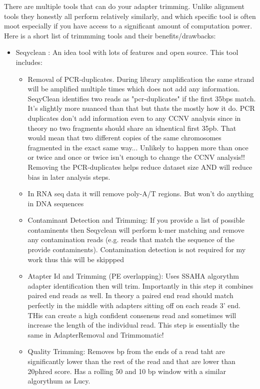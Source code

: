 \documentclass{article}
\begin{document}
    There are multiple tools that can do your adapter trimming.  Unlike alignment tools they honestly all perform relatively similarly, and which specific tool is often moot especially if you have access to a significant amount of computation power.  Here is a short list of trimmming tools and their benefits/drawbacks:
    \begin{itemize}
        \item Seqyclean \cite{zhbannikovSeqyCleanPipelineHighthroughput2017b}:  An idea tool with lots of features and open source.  This tool includes:
            \begin{itemize}
                \item Removal of PCR-duplicates.  During library amplification the same strand will be amplified multiple times which does not add any information.  SeqyClean identifies two reads as "pcr-duplicates" if the first 35bps match.  It's slightly more nuanced than that but thats the mostly how it do.  PCR duplicates don't add information even to any CCNV analysis since in theory no two fragments should share an idnentical first 35pb.   That would mean that two different copies of the same chromosomes fragmented in the exact same way... Unlikely to happen more than once or twice and once or twice isn't enough to change the CCNV analysis!!  Removing the PCR-duplicates helps reduce dataset size AND will reduce bias in later analysis steps.
                \item In RNA seq data it will remove poly-A/T regions.   But won't do anything in DNA sequences
                \item Contaminant Detection and Trimming:   If you provide a list of possible contaminents then Seqyclean will perform k-mer matching and remove any contamination reads (e.g. reads that match the sequence of the provide contaminents).   Contamination detection is not required for my work thus this will be skippped
                \item Atapter Id and Trimming (PE overlapping):  Uses SSAHA \cite{ningSSAHAFastSearch2001} algorythm adapter identification then will trim.  Importantly in this step it combines paired end reads as well.   In theory a paired end read should match perfectly in the middle with adapters sitting off on each reads 3' end.     THis can create a high confident consensus read and sometimes will increase the length of the individual read.  This step is essentially the same in AdapterRemoval and Trimmomatic!
                \item Quality Trimming:  Removes bp from the ends of a read taht are significantly lower than the rest of the read and that are lower than 20phred score.   Has a rolling 50 and 10 bp window with a similar algorythum as Lucy.   

\end{itemize}
\end{itemize}
\end{document}
